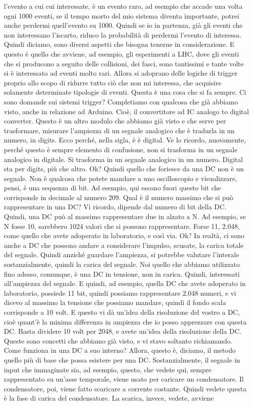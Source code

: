 l'evento a cui cui interessate, è un evento raro, ad esempio che accade una volta ogni 1000 eventi, se il tempo morto del mio sistema diventa importante, potrei anche perdermi quell'evento su 1000. Quindi se io in partenza, già gli eventi che non interessano l'iscarto, riduco la probabilità di perdermi l'evento di interessa. Quindi diciamo, sono diversi aspetti che bisogna tenerne in considerazione. E questo è quello che avviene, ad esempio, gli esperimenti a LHC, dove gli eventi che si producono a seguito delle collisioni, dei fasci, sono tantissimi e tante volte si è interessato ad eventi molto rari. Allora si adoprano delle logiche di trigger proprio allo scopo di ridurre tutto ciò che non mi interessa, che acquisire solamente determinate tipologie di eventi. Questa è una cosa che si fa sempre. Ci sono domande sui sistemi trigger? Completiamo con qualcosa che già abbiamo visto, anche in relazione ad Arduino. Cioè, il convertitore ad IC analogo to digital converter. Questo è un altro modulo che abbiamo già visto e che serve per trasformare, misurare l'ampiezza di un segnale analogico che è tradurla in un numero, in digits. Ecco perché, nella sigla, è è digital. Ve lo ricordo, nuovamente, perché questo è sempre elemento di confusione, non si trasforma in un segnale analogico in digitale. Si trasforma in un segnale analogico in un numero. Digital sta per digits, più che altro. Ok? Quindi quello che foriesce da una DC non è un segnale. Non è qualcosa che potete mandare a uno oscilloscopio e visualizzare, pensi, è una sequenza di bit. Ad esempio, qui escono fuori questo bit che corrisponde in decimale al numero 209. Qual è il numero massimo che si può rappresentare in una DC? Vi ricordo, dipende dal numero di bit della DC. Quindi, una DC può al massimo rappresentare due in alzato a N. Ad esempio, se N fosse 10, sarebbero 1024 valori che si possono rappresentare. Forse 11, 2.048, come quello che avete adoperato in laboratorio, e così via. Ok? In realtà, ci sono anche a DC che possono andare a considerare l'impulso, scusate, la carica totale del segnale. Quindi anziché guardare l'ampiezza, si potrebbe valutare l'interale sostanzialmente, quindi la carica del segnale. Noi quello che abbiamo utilizzato fino adesso, comunque, è una DC in tensione, non in carica. Quindi, interessati all'ampiezza del segnale. E quindi, ad esempio, quella DC che avete adoperato in laboratorio, possiede 11 bit, quindi possiamo rappresentare 2.048 numeri, e vi dicevo al massimo la tensione che possiamo mandare, quindi il fondo scala corrisponde a 10 volt. E questo vi dà un'idea della risoluzione del vostro a DC, cioè quant'è la minima differenza in ampiezza che io posso apprezzare con questa DC. Basta dividere 10 volt per 2048, e avete un'idea della risoluzione della DC. Queste sono concetti che abbiamo già visto, e vi stavo soltanto richiamando. Come funziona in una DC a suo interno? Allora, questo è, diciamo, il metodo quello più di base che possa esistere per una DC. Sostanzialmente, il segnale in input che immaginate sia, ad esempio, questo, che vedete qui, sempre rappresentato su un'asse temporale, viene usato per caricare un condensatore. Il condensatore, poi, viene fatto scaricare a corrente costante. Quindi vedete questa è la fase di carica del condensatore. La scarica, invece, vedete, avviene 